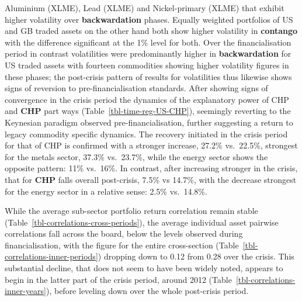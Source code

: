 \documentclass[
  authoryear,
  preprint,
  3p]{elsarticle}
\begin{document}
Aluminium (XLME), Lead (XLME) and Nickel-primary (XLME) that exhibit
higher volatility over \textbf{backwardation} phases. Equally weighted
portfolios of US and GB traded assets on the other hand both show higher
volatility in \textbf{contango} with the difference significant at the
1\% level for both. Over the financialisation period in contrast
volatilities were predominantly higher in \textbf{backwardation} for US
traded assets with fourteen commodities showing higher volatility
figures in these phases; the post-crisis pattern of results for
volatilities thus likewise shows signs of reversion to
pre-financialisation standards. After showing signs of convergence in
the crisis period the dynamics of the explanatory power of CHP and
\textbf{CHP} part ways (Table~\ref{tbl-time-reg-US-CHP}), seemingly
reverting to the Keynesian paradigm observed pre-financialisation,
further suggesting a return to legacy commodity specific dynamics. The
recovery initiated in the crisis period for that of CHP is confirmed
with a stronger increase, 27.2\% vs.~22.5\%, strongest for the metals
sector, 37.3\% vs.~23.7\%, while the energy sector shows the opposite
pattern: 11\% vs.~16\%. In contrast, after increasing stronger in the
crisis, that for \textbf{CHP} falls overall post-crisis, 7.5\% vs
14.7\%, with the decrease strongest for the energy sector in a relative
sense: 2.5\% vs.~14.8\%.

\medskip

While the average sub-sector portfolio return correlation remain stable
(Table~\ref{tbl-correlations-cross-periods}), the average individual
asset pairwise correlations fall across the board, below the levels
observed during financialisation, with the figure for the entire
cross-section (Table~\ref{tbl-correlations-inner-periods}) dropping down
to 0.12 from 0.28 over the crisis. This substantial decline, that does
not seem to have been widely noted, appears to begin in the latter part
of the crisis period, around 2012
(Table~\ref{tbl-correlations-inner-years}), before leveling down over
the whole post-crisis period.

\medskip
\end{document}
